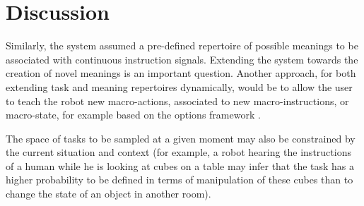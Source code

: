 \section{Discussion}
\label{chapter:limitations:discussion}

Similarly, the system assumed a pre-defined repertoire of possible meanings to be associated with continuous instruction signals. Extending the system towards the creation of novel meanings is an important question. Another approach, for both extending task and meaning repertoires dynamically, would be to allow the user to teach the robot new macro-actions, associated to new macro-instructions, or macro-state, for example based on the options framework \cite{sutton1999between}.

The space of tasks to be sampled at a given moment may also be constrained by the current situation and context (for example, a robot hearing the instructions of a human while he is looking at cubes on a table may infer that the task has a higher probability to be defined in terms of manipulation of these cubes than to change the state of an object in another room). 